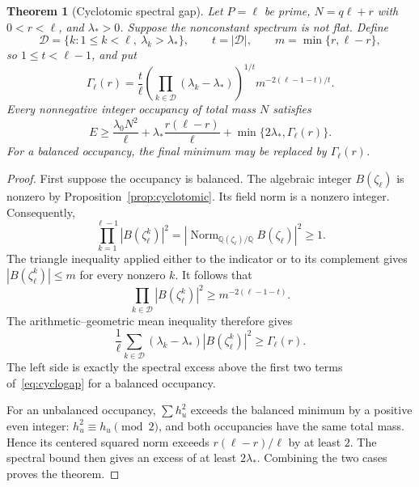 \documentclass[11pt,a4paper]{article}
\newtheorem{theorem}{Theorem}\newtheorem{proposition}[theorem]{Proposition}\newtheorem{lemma}[theorem]{Lemma}\newtheorem{corollary}[theorem]{Corollary}\theoremstyle{definition}\newtheorem{definition}[theorem]{Definition}\newtheorem{example}[theorem]{Example}
\begin{document}
\begin{theorem}[Cyclotomic spectral gap]\label{thm:cyclogap}
Let $P=\ell$ be prime, $N=q\ell+r$ with $0<r<\ell$, and $\lambda_*>0$.
Suppose the nonconstant spectrum is not flat. Define
\[
 \mathcal D=\{k:1\le k<\ell,\ \lambda_k>\lambda_*\},\qquad
 t=|\mathcal D|,\qquad m=\min\{r,\ell-r\},
\]
so $1\le t<\ell-1$, and put
\begin{equation}\label{eq:gamma}
 \Gamma_\ell(r)=\frac{t}{\ell}
 \left(\prod_{k\in\mathcal D}(\lambda_k-\lambda_*)\right)^{1/t}
 m^{-2(\ell-1-t)/t}.
\end{equation}
Every nonnegative integer occupancy of total mass $N$ satisfies
\begin{equation}\label{eq:cyclogap}
 \boxed{E\ge\frac{\lambda_0N^2}{\ell}
 +\lambda_*\frac{r(\ell-r)}{\ell}
 +\min\{2\lambda_*,\Gamma_\ell(r)\}.}
\end{equation}
For a balanced occupancy, the final minimum may be replaced by
$\Gamma_\ell(r)$.
\end{theorem}
\begin{proof}
First suppose the occupancy is balanced. The algebraic integer
$B(\zeta_\ell)$ is nonzero by Proposition~\ref{prop:cyclotomic}.
Its field norm is a nonzero integer. Consequently,
\begin{equation}\label{eq:normproduct}
 \prod_{k=1}^{\ell-1}|B(\zeta_\ell^k)|^2
 =\left|\operatorname{Norm}_{\mathbb Q(\zeta_\ell)/\mathbb Q}
       B(\zeta_\ell)\right|^2\ge1.
\end{equation}
The triangle inequality applied either to the indicator or to its
complement gives $|B(\zeta_\ell^k)|\le m$ for every nonzero $k$.
It follows that
\[
 \prod_{k\in\mathcal D}|B(\zeta_\ell^k)|^2
 \ge m^{-2(\ell-1-t)}.
\]
The arithmetic--geometric mean inequality therefore gives
\[
 \frac1\ell\sum_{k\in\mathcal D}
   (\lambda_k-\lambda_*)|B(\zeta_\ell^k)|^2
 \ge\Gamma_\ell(r).
\]
The left side is exactly the spectral excess above the first two terms
of~\eqref{eq:cyclogap} for a balanced occupancy.

For an unbalanced occupancy, $\sum h_u^2$ exceeds the balanced minimum
by a positive even integer: $h_u^2\equiv h_u\pmod2$, and both occupancies
have the same total mass. Hence its centered squared norm exceeds
$r(\ell-r)/\ell$ by at least $2$. The spectral bound then gives an excess
of at least $2\lambda_*$. Combining the two cases proves the theorem.
\end{proof}
\end{document}
